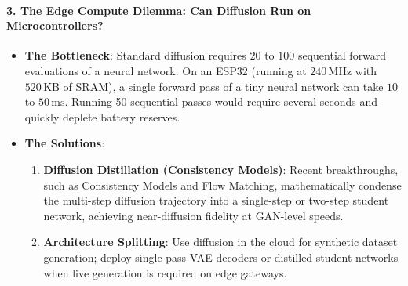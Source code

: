 \begin{iotbox}
\paragraph{3. The Edge Compute Dilemma: Can Diffusion Run on Microcontrollers?}
\begin{itemize}
    \item \textbf{The Bottleneck}: Standard diffusion requires $20$ to $100$ sequential forward evaluations of a neural network. On an ESP32 (running at $240\,\text{MHz}$ with $520\,\text{KB}$ of SRAM), a single forward pass of a tiny neural network can take $10$ to $50\,\text{ms}$. Running 50 sequential passes would require several seconds and quickly deplete battery reserves.
    \item \textbf{The Solutions}:
    \begin{enumerate}
        \item \textbf{Diffusion Distillation (Consistency Models)}: Recent breakthroughs, such as Consistency Models and Flow Matching, mathematically condense the multi-step diffusion trajectory into a single-step or two-step student network, achieving near-diffusion fidelity at GAN-level speeds.
        \item \textbf{Architecture Splitting}: Use diffusion in the cloud for synthetic dataset generation; deploy single-pass VAE decoders or distilled student networks when live generation is required on edge gateways.
    \end{enumerate}
\end{itemize}
\end{iotbox}

